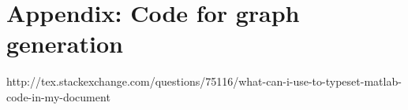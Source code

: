 \documentclass[../report.tex]{subfiles}
\begin{document}
\chapter*{Appendix: Code for graph generation}
http://tex.stackexchange.com/questions/75116/what-can-i-use-to-typeset-matlab-code-in-my-document
\end{document}
